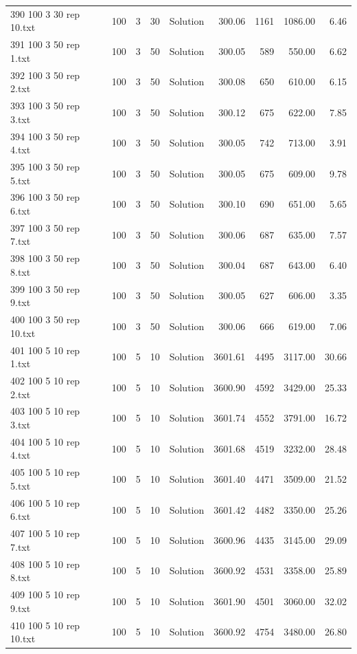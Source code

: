 \begin{longtable}{lrrllrrrr}
390 100 3 30 rep 10.txt & 100 & 3 & 30 & Solution & 300.06 & 1161 & 1086.00 &  6.46\\
391 100 3 50 rep 1.txt & 100 & 3 & 50 & Solution & 300.05 & 589 & 550.00 &  6.62\\
392 100 3 50 rep 2.txt & 100 & 3 & 50 & Solution & 300.08 & 650 & 610.00 &  6.15\\
393 100 3 50 rep 3.txt & 100 & 3 & 50 & Solution & 300.12 & 675 & 622.00 &  7.85\\
394 100 3 50 rep 4.txt & 100 & 3 & 50 & Solution & 300.05 & 742 & 713.00 &  3.91\\
395 100 3 50 rep 5.txt & 100 & 3 & 50 & Solution & 300.05 & 675 & 609.00 &  9.78\\
396 100 3 50 rep 6.txt & 100 & 3 & 50 & Solution & 300.10 & 690 & 651.00 &  5.65\\
397 100 3 50 rep 7.txt & 100 & 3 & 50 & Solution & 300.06 & 687 & 635.00 &  7.57\\
398 100 3 50 rep 8.txt & 100 & 3 & 50 & Solution & 300.04 & 687 & 643.00 &  6.40\\
399 100 3 50 rep 9.txt & 100 & 3 & 50 & Solution & 300.05 & 627 & 606.00 &  3.35\\
400 100 3 50 rep 10.txt & 100 & 3 & 50 & Solution & 300.06 & 666 & 619.00 &  7.06\\
401 100 5 10 rep 1.txt & 100 & 5 & 10 & Solution & 3601.61 & 4495 & 3117.00 & 30.66\\
402 100 5 10 rep 2.txt & 100 & 5 & 10 & Solution & 3600.90 & 4592 & 3429.00 & 25.33\\
403 100 5 10 rep 3.txt & 100 & 5 & 10 & Solution & 3601.74 & 4552 & 3791.00 & 16.72\\
404 100 5 10 rep 4.txt & 100 & 5 & 10 & Solution & 3601.68 & 4519 & 3232.00 & 28.48\\
405 100 5 10 rep 5.txt & 100 & 5 & 10 & Solution & 3601.40 & 4471 & 3509.00 & 21.52\\
406 100 5 10 rep 6.txt & 100 & 5 & 10 & Solution & 3601.42 & 4482 & 3350.00 & 25.26\\
407 100 5 10 rep 7.txt & 100 & 5 & 10 & Solution & 3600.96 & 4435 & 3145.00 & 29.09\\
408 100 5 10 rep 8.txt & 100 & 5 & 10 & Solution & 3600.92 & 4531 & 3358.00 & 25.89\\
409 100 5 10 rep 9.txt & 100 & 5 & 10 & Solution & 3601.90 & 4501 & 3060.00 & 32.02\\
410 100 5 10 rep 10.txt & 100 & 5 & 10 & Solution & 3600.92 & 4754 & 3480.00 & 26.80\\

\end{longtable}
